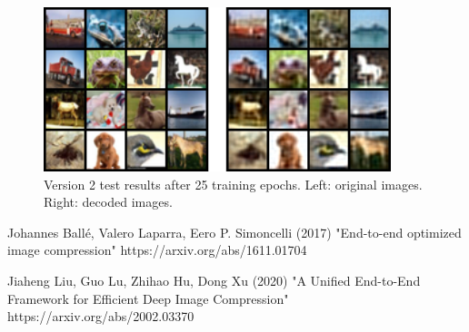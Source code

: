 \documentclass[10pt]{article}
\begin{document}
\begin{center}
\begin{figure}
\caption{Version 2 test results after 25 training epochs. Left: original images. Right: decoded images.}
\includegraphics[width=0.9\textwidth]{20220530 2 v2.PNG}
\end{figure}
\end{center}


\begin{thebibliography}{9}

Johannes Ballé, Valero Laparra, Eero P. Simoncelli (2017) "End-to-end optimized image compression" https://arxiv.org/abs/1611.01704

Jiaheng Liu, Guo Lu, Zhihao Hu, Dong Xu (2020) "A Unified End-to-End Framework for Efficient Deep Image Compression" https://arxiv.org/abs/2002.03370

\end{thebibliography}
\end{document}
